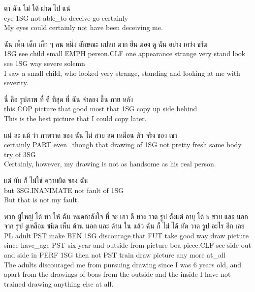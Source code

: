 \documentclass{book}
\begin{document}
	\begin{exe}
		\ex 
		\gll ตา ฉัน ไม่ ได้ ฝาด ไป แน่\\
		eye \textsc{1SG} not able\_to deceive go certainly\\
		My eyes could certainly not have been deceiving me.
	\end{exe}

	\begin{exe}
		\ex 
		\gll ฉัน เห็น เด็ก เล็ก ๆ คน หนึ่ง ลักษณะ แปลก มาก ยืน มอง ดู ฉัน อย่าง เคร่ง ขรึม\\
		\textsc{1SG} see child small \textsc{EMPH} person.\textsc{CLF} one appearance strange very stand look see \textsc{1SG} way severe solemn\\
		I saw a small child, who looked very strange, standing and looking at me with severity.
	\end{exe}

	\begin{exe}
		\ex 
		\gll นี่ คือ รูปภาพ ที่ ดี ที่สุด ที่ ฉัน จำลอง ขึ้น ภาย หลัง\\
		this \textsc{COP} picture that good most that \textsc{1SG} copy up side behind\\
		This is the best picture that I could copy later.
	\end{exe}

	\begin{exe}
		\ex 
		\gll แน่ ละ แม้ ว่า ภาพวาด ของ ฉัน ไม่ สวย สด เหมือน ตัว จริง ของ เขา\\
		certainly \textsc{PART} even_though that drawing of \textsc{1SG} not pretty fresh same body try of \textsc{3SG}\\
		Certainly, however, my drawing is not as handsome as his real person.
	\end{exe}

	\begin{exe}
		\ex 
		\gll แต่ มัน ก็ ไม่ใช่ ความผิด ของ ฉัน\\
		but \textsc{3SG}.\textsc{INANIMATE} not fault of \textsc{1SG}\\
		But that is not my fault.
	\end{exe}

	\begin{exe}
		\ex 
		\gll พวก ผู้ใหญ่ ได้ ทำ ให้ ฉัน หมดกำลังใจ ที่ จะ เอา ดี ทาง วาด รูป ตั้งแต่ อายุ ได้ ๖ ขวบ และ นอก จาก รูป งูเหลือม ชนิด เห็น ด้าน นอก และ ด้าน ใน แล้ว ฉัน ก็ ไม่ ได้ หัด วาด รูป อะไร อีก เลย\\
		\textsc{PL} adult \textsc{PST} make \textsc{BEN} \textsc{1SG} discourage that \textsc{FUT} take good way draw picture since have_age \textsc{PST} six year and outside from picture boa piece.\textsc{CLF} see side out and side in \textsc{PERF} \textsc{1SG} then not \textsc{PST} train draw picture any more at_all\\
		The adults discouraged me from pursuing drawing since I was 6 years old, and apart from the drawings of boas from the outside and the inside I have not trained drawing anything else at all.
	\end{exe}
\end{document}
